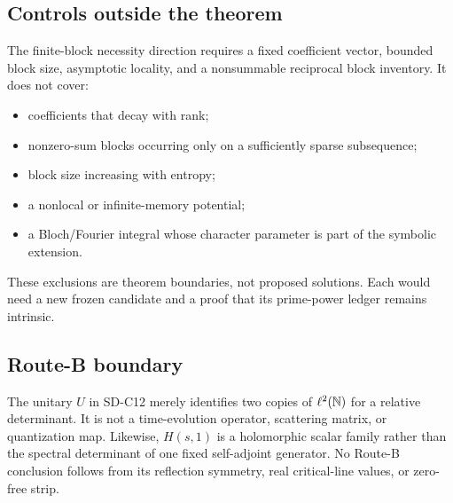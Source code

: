\subsection{Controls outside the theorem}

The finite-block necessity direction requires a fixed coefficient vector,
bounded block size, asymptotic locality, and a nonsummable reciprocal block
inventory.  It does not cover:
\begin{itemize}
 \item coefficients that decay with rank;
 \item nonzero-sum blocks occurring only on a sufficiently sparse subsequence;
 \item block size increasing with entropy;
 \item a nonlocal or infinite-memory potential;
 \item a Bloch/Fourier integral whose character parameter is part of the
       symbolic extension.
\end{itemize}
These exclusions are theorem boundaries, not proposed solutions.  Each would
need a new frozen candidate and a proof that its prime-power ledger remains
intrinsic.

\subsection{Route-B boundary}

The unitary $U$ in SD-C12 merely identifies two copies of $\ell^2(\mathbb N)$ for a
relative determinant.  It is not a time-evolution operator, scattering matrix,
or quantization map.  Likewise, $H(s,1)$ is a holomorphic scalar family rather
than the spectral determinant of one fixed self-adjoint generator.  No
Route-B conclusion follows from its reflection symmetry, real critical-line
values, or zero-free strip.
